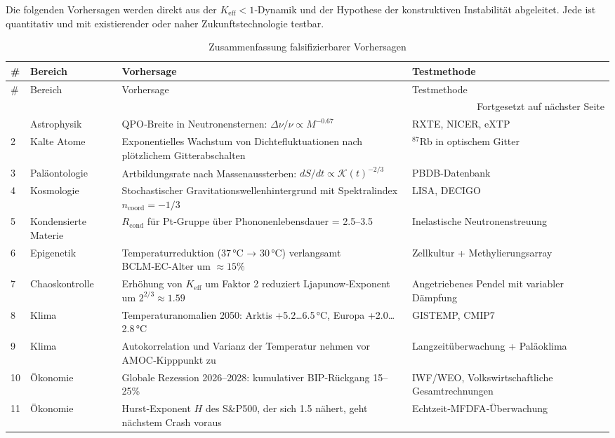 \documentclass[12pt,a4paper]{article}
\newcommand{\Keff}{K_{\mathrm{eff}}}
\newcommand{\REL}{\mathcal{K}}
\begin{document}
	Die folgenden Vorhersagen werden direkt aus der $\Keff < 1$‑Dynamik und der
	Hypothese der konstruktiven Instabilität abgeleitet. Jede ist quantitativ und mit
	existierender oder naher Zukunftstechnologie testbar.
	
	\begin{longtable}{|p{2cm}|p{3cm}|p{4.5cm}|p{4cm}|}
		\caption{Zusammenfassung falsifizierbarer Vorhersagen}\label{tab:predictions}\\
		\hline
		\textbf{\#} & \textbf{Bereich} & \textbf{Vorhersage} & \textbf{Testmethode} \\
		\hline
		\endfirsthead
		\hline
		\# & Bereich & Vorhersage & Testmethode \\
		\hline
		\endhead
		\hline
		\multicolumn{4}{r}{Fortgesetzt auf nächster Seite} \\
		\endfoot
		\hline
		\endlastfoot
		1 & Astrophysik & QPO‑Breite in Neutronensternen: $\Delta\nu/\nu \propto M^{-0.67}$ & RXTE, NICER, eXTP \\
		2 & Kalte Atome & Exponentielles Wachstum von Dichtefluktuationen nach plötzlichem Gitterabschalten & ${}^{87}$Rb in optischem Gitter \\
		3 & Paläontologie & Artbildungsrate nach Massenaussterben: $dS/dt \propto \REL(t)^{-2/3}$ & PBDB‑Datenbank \\
		4 & Kosmologie & Stochastischer Gravitationswellenhintergrund mit Spektralindex $n_{\mathrm{coord}} = -1/3$ & LISA, DECIGO \\
		5 & Kondensierte Materie & $R_{\text{cond}}$ für Pt‑Gruppe über Phononenlebensdauer = 2.5–3.5 & Inelastische Neutronenstreuung \\
		6 & Epigenetik & Temperaturreduktion (37 °C → 30 °C) verlangsamt BCLM‑EC‑Alter um $\approx 15\%$ & Zellkultur + Methylierungsarray \\
		7 & Chaoskontrolle & Erhöhung von $\Keff$ um Faktor 2 reduziert Ljapunow‑Exponent um $2^{2/3} \approx 1.59$ & Angetriebenes Pendel mit variabler Dämpfung \\
		8 & Klima & Temperaturanomalien 2050: Arktis +5.2…6.5 °C, Europa +2.0…2.8 °C & GISTEMP, CMIP7 \\
		9 & Klima & Autokorrelation und Varianz der Temperatur nehmen vor AMOC‑Kipppunkt zu & Langzeitüberwachung + Paläoklima \\
		10 & Ökonomie & Globale Rezession 2026–2028: kumulativer BIP‑Rückgang 15–25\% & IWF/WEO, Volkswirtschaftliche Gesamtrechnungen \\
		11 & Ökonomie & Hurst‑Exponent $H$ des S\&P500, der sich 1.5 nähert, geht nächstem Crash voraus & Echtzeit‑MFDFA‑Überwachung \\
	\end{longtable}
	
\end{document}
